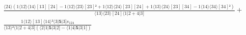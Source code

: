 \documentclass[varwidth, border=5pt]{standalone}
\begin{document}
\begin{my}
$\begin{gathered}
\scriptscriptstyle\frac{⟨24⟩(1⟨12⟩⟨14⟩[13][24]-1⟨12⟩⟨23⟩[23]²+1⟨12⟩⟨24⟩[23][24]+1⟨13⟩⟨24⟩[23][34]-1⟨14⟩⟨34⟩[34]²)}{⟨13⟩⟨23⟩[24]⟨1|2+4|3]} +\\
\scriptscriptstyle\frac{1⟨12⟩[13]⟨14⟩²⟨3|𝟓|3]s_{124}}{⟨13⟩²⟨1|2+4|3](⟨2|1|𝟓|3|2]-⟨1|4|𝟓|3|1])} \phantom{+}
\end{gathered}$
\end{my}
\end{document}
